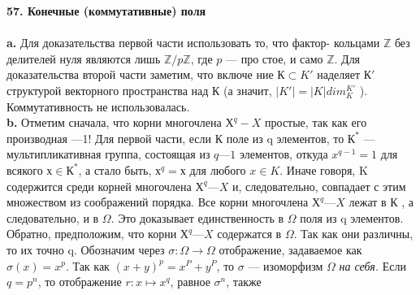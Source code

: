 \pagebreak
\noindent\textbf{57. Конечные (коммутативные) поля}\\
\\
\hspace*{15pt}\textbf{a.} Для доказательства первой части использовать то, что фактор-\linebreak
кольцами $\mathbb{Z}$ без делителей нуля являются лишь $\mathbb{Z}/p\mathbb{Z}$, где $p$ --- про­\linebreak
стое, и само $\mathbb{Z}$. Для доказательства второй части заметим, что включе­\linebreak
ние $К \subset K'$ наделяет $К'$ структурой векторного пространства над $К$\linebreak
(а значит, $|K'| = |K| dim_K^{K'}$ ). Коммутативность не использовалась.\\
\hspace*{15pt}\textbf{b.} Отметим сначала, что корни многочлена $Х^{q} - X$ простые, так\linebreak
как его производная —1! Для первой части, если К поле из q элементов,\linebreak
то $К^{*}$ --- мультипликативная группа, состоящая из $q — 1$ элементов,\linebreak
откуда $x^{q-1} = 1$ для всякого $х \in К^{*}$, а стало быть, $х^{q} = х$ для любого\linebreak
$x \in K$. Иначе говоря, K содержится среди корней многочлена $Х^{q} — X$ и,\linebreak
следовательно, совпадает с этим множеством из соображений порядка.\linebreak
Все корни многочлена $Х^{q} — X$ лежат в К , а следовательно, и в $\Omega$. Это\linebreak
доказывает единственность в $\Omega$ поля из q элементов.\\
\hspace*{0pt} Обратно, предположим, что корни $Х^{q} — X$ содержатся в $\Omega$. Так как\linebreak
они различны, то их точно q. Обозначим через $\sigma : \Omega \rightarrow \Omega$ отображение,\linebreak
задаваемое как $\sigma(x) = x^{p}$. Так как $(x + y)^{p} = x^{P} + y^{P}$, то $\sigma$ --- изоморфизм\linebreak
$\Omega$ \textit{на себя.} Если $q = p^{n}$, то отображение $r : x \mapsto x^{q}$, равное $\sigma^{n}$, также\linebreak
